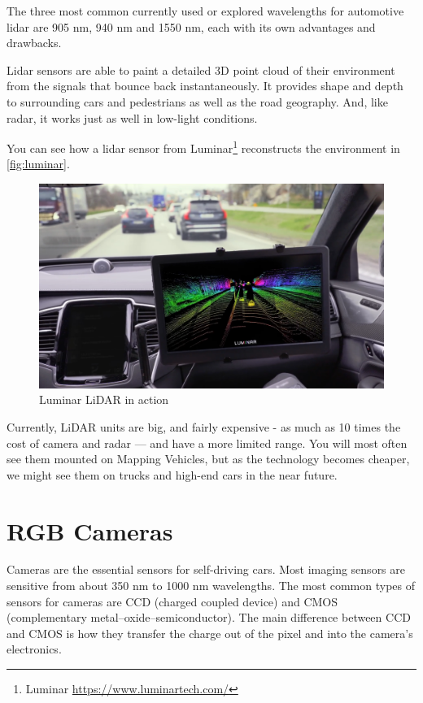 The three most common currently used or explored wavelengths for automotive
lidar are 905 nm, 940 nm and 1550 nm, each with its own advantages and
drawbacks.

Lidar sensors are able to paint a detailed 3D point cloud of their environment
from the signals that bounce back instantaneously. It provides shape and depth
to surrounding cars and pedestrians as well as the road geography. And, like
radar, it works just as well in low-light conditions.

You can see how a lidar sensor from Luminar\footnote{Luminar
\url{https://www.luminartech.com/}} reconstructs the environment in
\autoref{fig:luminar}.

\begin{figure}[!ht]
    \centering
    \includegraphics[width=150mm, keepaspectratio]{figures/luminar.png}
    \caption{Luminar LiDAR in action}
    \label{fig:luminar}
\end{figure}


Currently, LiDAR units are big, and fairly expensive - as much as 10 times
the cost of camera and radar — and have a more limited range. You will most
often see them mounted on Mapping Vehicles, but as the technology becomes
cheaper, we might see them on trucks and high-end cars in the near future.

\section{RGB Cameras}

Cameras are the essential sensors for self-driving cars. Most imaging sensors
are sensitive from about 350 nm to 1000 nm wavelengths. The most common types of
sensors for cameras are CCD (charged coupled device) and CMOS (complementary
metal–oxide–semiconductor). The main difference between CCD and CMOS is how they
transfer the charge out of the pixel and into the camera’s electronics.

